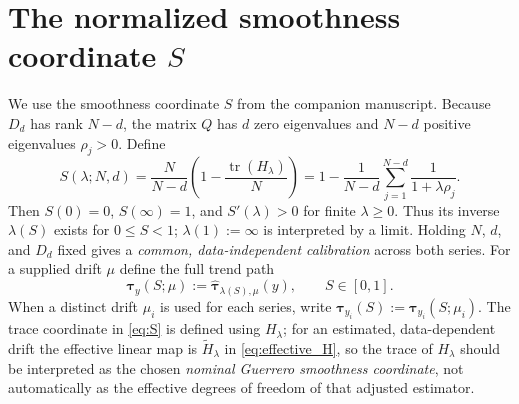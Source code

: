 \documentclass[10pt,letterpaper]{article}
\begin{document}
\section{The normalized smoothness coordinate \texorpdfstring{$S$}{S}}
\label{sec:smoothness}
We use the smoothness coordinate $S$ from the companion manuscript.
Because $D_d$ has rank $N-d$, the matrix $Q$ has $d$ zero eigenvalues
and $N-d$ positive eigenvalues $\rho_j>0$. Define
\begin{equation}\label{eq:S}
 S(\lambda;N,d)
 =\frac{N}{N-d}\left(1-\frac{\operatorname{tr}(H_\lambda)}{N}\right)
 =1-\frac{1}{N-d}\sum_{j=1}^{N-d}
      \frac{1}{1+\lambda\rho_j}.
\end{equation}
Then $S(0)=0$, $S(\infty)=1$, and $S'(\lambda)>0$ for finite
$\lambda\ge0$. Thus its inverse $\lambda(S)$ exists for $0\le S<1$;
$\lambda(1):=\infty$ is interpreted by a limit. Holding $N$, $d$,
and $D_d$ fixed gives a \emph{common, data-independent calibration}
across both series. For a supplied drift $\mu$ define the full trend
path
\begin{equation}\label{eq:path}
 \bm\tau_y(S;\mu)
 :=\widehat{\bm\tau}_{\lambda(S),\mu}(y),
 \qquad S\in[0,1].
\end{equation}
When a distinct drift $\mu_i$ is used for each series, write
$\bm\tau_{y_i}(S):=\bm\tau_{y_i}(S;\mu_i)$.
The trace coordinate in \eqref{eq:S} is defined using $H_\lambda$;
for an estimated, data-dependent drift the effective linear map is
$\widetilde H_\lambda$ in \eqref{eq:effective_H}, so the trace of
$H_\lambda$ should be interpreted as the chosen \emph{nominal
Guerrero smoothness coordinate}, not automatically as the effective
degrees of freedom of that adjusted estimator.
\end{document}
